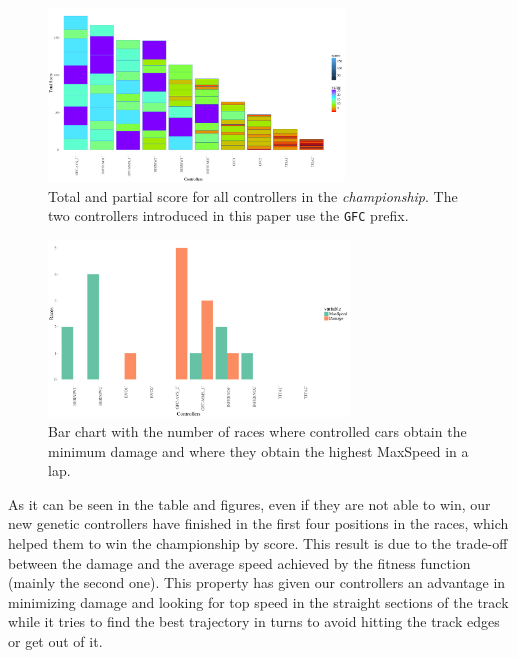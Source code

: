 \documentclass[conference]{IEEEtran}
\begin{document}
\begin{figure}[h!tb]	
  \begin{center}
    \includegraphics[width=0.70\textwidth]{fig/POINTS.png}
    \caption{Total and partial score for all controllers in the {\em
        championship}. The two controllers introduced in
    this paper use the {\tt GFC} prefix.}
    \label{fig:points}	
  \end{center}	
\end{figure}
%
\begin{figure}[!ht]	
	\begin{center}
          \includegraphics[width=8cm]{fig/HISTSD.png}
		\caption{Bar chart with the number of races where controlled
                  cars obtain the minimum damage and where they obtain the highest MaxSpeed in a lap.}
		\label{fig:damspeed}	
	\end{center}	
\end{figure}

As it can be seen in the table and figures, even if they are not able to win, our new genetic controllers have finished in the first four positions in the races, which helped them to win the  championship by score.
This result is due to the trade-off between the damage and the average speed achieved by the fitness function (mainly the second one). This property has given our controllers an advantage in minimizing damage and looking for top speed in the straight sections of the track while it tries to find the best trajectory in turns to avoid hitting the track edges or get out of it.
\end{document}
